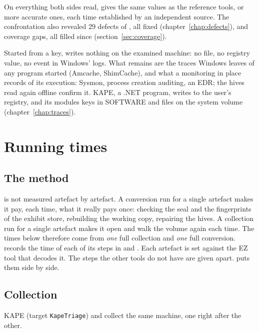 \documentclass[11pt,a4paper,oneside]{report}
\begin{document}
\begin{note}
On everything both sides read, \wac{} gives the same values as the reference
tools, or more accurate ones, each time established by an independent source.
The confrontation also revealed 29 defects of \wac{}, all fixed
(chapter~\ref{chap:defects}), and coverage gaps, all filled since
(section~\ref{sec:coverage}).

Started from a key, \wac{} writes nothing on the examined machine: no file, no
registry value, no event in Windows' logs. What remains are the traces Windows
leaves of any program started (Amcache, ShimCache), and what a monitoring in
place records of its execution: Sysmon, process creation auditing, an EDR;
the hives read again offline confirm it. KAPE, a .NET program, writes to the
user's registry, and its modules keys in SOFTWARE and files on the system
volume (chapter~\ref{chap:traces}).
\end{note}

\chapter{Running times}\label{chap:time}

\section{The method}

\wac{} is not measured artefact by artefact. A conversion run for a single
artefact makes it pay, each time, what it really pays once: checking the seal
and the fingerprints of the exhibit store, rebuilding the working copy,
repairing the hives. A collection run for a single artefact makes it open and
walk the volume again each time. The times below therefore come from \emph{one}
full collection and \emph{one} full conversion. \wac{} records the time of each
of its steps in  and .
Each artefact is set against the EZ tool that decodes it. The steps the other
tools do not have are given apart.  puts
them side by side.

\section{Collection}

KAPE (target \texttt{KapeTriage}) and \wac{} collect the same machine, one
right after the other.
\end{document}
